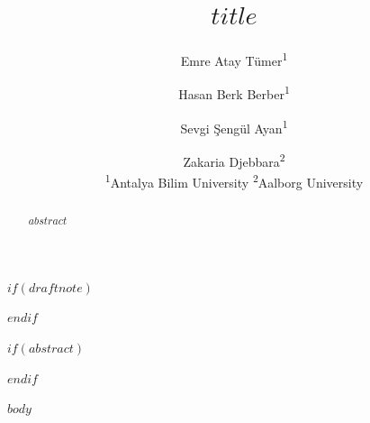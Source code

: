 \documentclass[11pt,a4paper]{article}
\title{$title$}
\author{Emre Atay Tümer\textsuperscript{1} \and Hasan Berk Berber\textsuperscript{1} \and
  Sevgi Şengül Ayan\textsuperscript{1} \and Zakaria Djebbara\textsuperscript{2}\\[4pt]
  \normalsize \textsuperscript{1}Antalya Bilim University \quad
  \textsuperscript{2}Aalborg University}
\date{}
\begin{document}
\maketitle

$if(draftnote)$
\begin{center}
\end{center}
$endif$

$if(abstract)$
\begin{abstract}
$abstract$
\end{abstract}
$endif$

$body$
\end{document}

